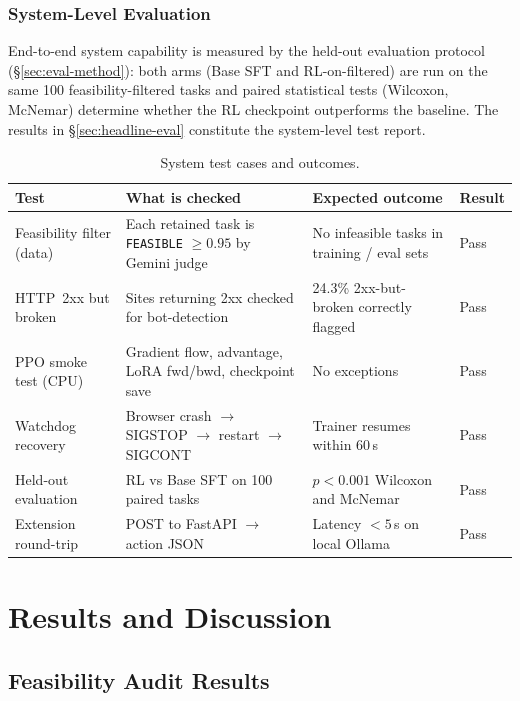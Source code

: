 \documentclass[12pt,a4paper]{report}
\begin{document}
\subsection*{System-Level Evaluation}

End-to-end system capability is measured by the held-out evaluation protocol (\S\ref{sec:eval-method}): both arms (Base SFT and RL-on-filtered) are run on the same 100 feasibility-filtered tasks and paired statistical tests (Wilcoxon, McNemar) determine whether the RL checkpoint outperforms the baseline. The results in \S\ref{sec:headline-eval} constitute the system-level test report.

\begin{table}[H]
\centering
\small
\begin{tabular}{p{3.2cm}p{4.2cm}p{4cm}p{1.8cm}}
\toprule
\textbf{Test} & \textbf{What is checked} & \textbf{Expected outcome} & \textbf{Result} \\
\midrule
Feasibility filter (data) & Each retained task is \texttt{FEASIBLE} $\geq 0.95$ by Gemini judge & No infeasible tasks in training / eval sets & Pass \\
HTTP~2xx but broken & Sites returning 2xx checked for bot-detection & 24.3\% 2xx-but-broken correctly flagged & Pass \\
PPO smoke test (CPU) & Gradient flow, advantage, LoRA fwd/bwd, checkpoint save & No exceptions & Pass \\
Watchdog recovery & Browser crash $\to$ SIGSTOP $\to$ restart $\to$ SIGCONT & Trainer resumes within 60\,s & Pass \\
Held-out evaluation & RL vs Base SFT on 100 paired tasks & $p < 0.001$ Wilcoxon and McNemar & Pass \\
Extension round-trip & POST to FastAPI $\to$ action JSON & Latency $< 5$\,s on local Ollama & Pass \\
\bottomrule
\end{tabular}
\caption{System test cases and outcomes.}
\label{tab:test-cases}
\end{table}

\chapter{Results and Discussion}\label{chap:results}

\section{Feasibility Audit Results}\label{sec:feasibility-results}
\end{document}
